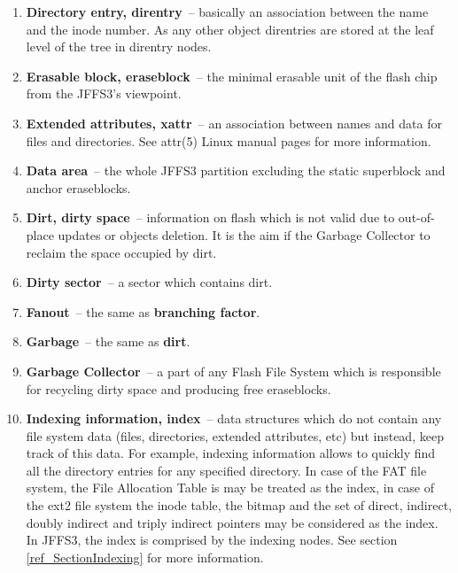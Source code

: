 \documentclass[12pt,a4paper,oneside,titlepage]{article}
\begin{document}
\begin{enumerate}
\item \textbf{Directory entry, direntry}~-- basically an association between
the name and the inode number. As any other object direntries are stored at the
leaf level of the tree in direntry nodes.

\item \textbf{Erasable block, eraseblock}~-- the minimal erasable unit of the
flash chip from the JFFS3's viewpoint.

\item \textbf{Extended attributes, xattr}~-- an association between names and
data for files and directories. See attr(5) Linux manual pages for more
information.

\item \textbf{Data area}~-- the whole JFFS3 partition excluding the static
superblock and anchor eraseblocks.

\item \textbf{Dirt, dirty space}~-- information on flash which is not valid due
to \mbox{out-of-place} updates or objects deletion. It is the aim if the
Garbage Collector to reclaim the space occupied by dirt.

\item \textbf{Dirty sector}~-- a sector which contains dirt.

\item \textbf{Fanout}~-- the same as \textbf{branching factor}.

\item \textbf{Garbage}~-- the same as \textbf{dirt}.

\item \textbf{Garbage Collector}~-- a part of any Flash File System which
is responsible for recycling dirty space and producing free eraseblocks.

\item \textbf{Indexing information, index}~-- data structures which do not
contain any file system data (files, directories, extended attributes, etc) but
instead, keep track of this data. For example, indexing information allows to
quickly find all the directory entries for any specified directory. In case of
the FAT file system, the File Allocation Table is may be treated as the index,
in case of the ext2 file system the inode table, the bitmap and the set of
direct, indirect, doubly indirect and triply indirect pointers may be
considered as the index. In JFFS3, the index is comprised by the indexing
nodes. See section \ref{ref_SectionIndexing} for more information.


\end{enumerate}
\end{document}
